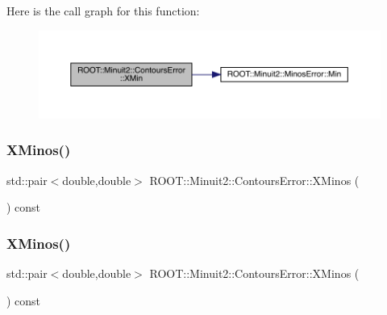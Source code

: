 Here is the call graph for this function\+:
\nopagebreak
\begin{figure}[H]
\begin{center}
\leavevmode
\includegraphics[width=350pt]{d3/de9/classROOT_1_1Minuit2_1_1ContoursError_ac0dbac1ec08765a632908c88c5f24822_cgraph}
\end{center}
\end{figure}
\mbox{\label{classROOT_1_1Minuit2_1_1ContoursError_afd1906c6e1b9ddd74363df072590183f}} 
\subsubsection{\texorpdfstring{XMinos()}{XMinos()}\hspace{0.1cm}{\footnotesize\ttfamily [1/3]}}
{\footnotesize\ttfamily std\+::pair$<$double,double$>$ R\+O\+O\+T\+::\+Minuit2\+::\+Contours\+Error\+::\+X\+Minos (\begin{DoxyParamCaption}{ }\end{DoxyParamCaption}) const\hspace{0.3cm}{\ttfamily [inline]}}

\mbox{\label{classROOT_1_1Minuit2_1_1ContoursError_afd1906c6e1b9ddd74363df072590183f}} 
\subsubsection{\texorpdfstring{XMinos()}{XMinos()}\hspace{0.1cm}{\footnotesize\ttfamily [2/3]}}
{\footnotesize\ttfamily std\+::pair$<$double,double$>$ R\+O\+O\+T\+::\+Minuit2\+::\+Contours\+Error\+::\+X\+Minos (\begin{DoxyParamCaption}{ }\end{DoxyParamCaption}) const\hspace{0.3cm}{\ttfamily [inline]}}

